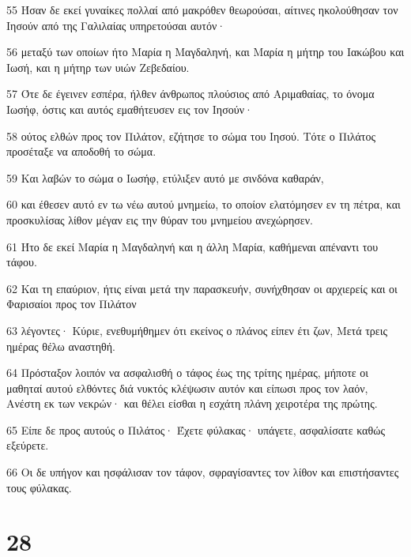 \par 55 Ήσαν δε εκεί γυναίκες πολλαί από μακρόθεν θεωρούσαι, αίτινες ηκολούθησαν τον Ιησούν από της Γαλιλαίας υπηρετούσαι αυτόν·
\par 56 μεταξύ των οποίων ήτο Μαρία η Μαγδαληνή, και Μαρία η μήτηρ του Ιακώβου και Ιωσή, και η μήτηρ των υιών Ζεβεδαίου.
\par 57 Ότε δε έγεινεν εσπέρα, ήλθεν άνθρωπος πλούσιος από Αριμαθαίας, το όνομα Ιωσήφ, όστις και αυτός εμαθήτευσεν εις τον Ιησούν·
\par 58 ούτος ελθών προς τον Πιλάτον, εζήτησε το σώμα του Ιησού. Τότε ο Πιλάτος προσέταξε να αποδοθή το σώμα.
\par 59 Και λαβών το σώμα ο Ιωσήφ, ετύλιξεν αυτό με σινδόνα καθαράν,
\par 60 και έθεσεν αυτό εν τω νέω αυτού μνημείω, το οποίον ελατόμησεν εν τη πέτρα, και προσκυλίσας λίθον μέγαν εις την θύραν του μνημείου ανεχώρησεν.
\par 61 Ήτο δε εκεί Μαρία η Μαγδαληνή και η άλλη Μαρία, καθήμεναι απέναντι του τάφου.
\par 62 Και τη επαύριον, ήτις είναι μετά την παρασκευήν, συνήχθησαν οι αρχιερείς και οι Φαρισαίοι προς τον Πιλάτον
\par 63 λέγοντες· Κύριε, ενεθυμήθημεν ότι εκείνος ο πλάνος είπεν έτι ζων, Μετά τρεις ημέρας θέλω αναστηθή.
\par 64 Πρόσταξον λοιπόν να ασφαλισθή ο τάφος έως της τρίτης ημέρας, μήποτε οι μαθηταί αυτού ελθόντες διά νυκτός κλέψωσιν αυτόν και είπωσι προς τον λαόν, Ανέστη εκ των νεκρών· και θέλει είσθαι η εσχάτη πλάνη χειροτέρα της πρώτης.
\par 65 Είπε δε προς αυτούς ο Πιλάτος· Έχετε φύλακας· υπάγετε, ασφαλίσατε καθώς εξεύρετε.
\par 66 Οι δε υπήγον και ησφάλισαν τον τάφον, σφραγίσαντες τον λίθον και επιστήσαντες τους φύλακας.

\chapter{28}

